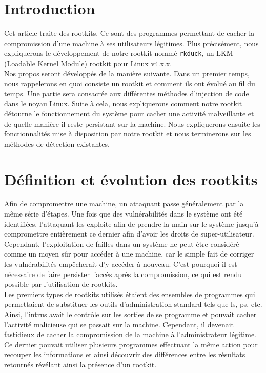 \documentclass[12pt]{article}
\begin{document}
\newcommand*{\escape}[1]{\texttt{\textbackslash#1}}
\newcommand*{\escapeI}[1]{\texttt{\expandafter\string\csname #1\endcsname}}
\newcommand*{\escapeII}[1]{\texttt{\char`\\#1}}


\section*{Introduction}

    Cet article traite des rootkits. Ce sont des programmes permettant de cacher la compromission d'une machine à ses utilisateurs légitimes. Plus précisément, nous expliquerons le développement de notre rootkit nommé \texttt{rkduck}, un LKM (Loadable Kernel Module) rootkit pour Linux v4.x.x. \\

    Nos propos seront développés de la manière suivante. Dans un premier temps, nous rappelerons en quoi consiste un rootkit et comment ils ont évolué au fil du temps. Une partie sera consacrée aux différentes méthodes d'injection de code dans le noyau Linux. Suite à cela, nous expliquerons comment notre rootkit détourne le fonctionnement du système pour cacher une activité malveillante et de quelle manière il reste persistant sur la machine. Nous expliquerons ensuite les fonctionnalités mise à disposition par notre rootkit et nous terminerons sur les méthodes de détection existantes.

\section{Définition et évolution des rootkits}

    Afin de compromettre une machine, un attaquant passe généralement par la même série d'étapes. Une fois que des vulnérabilités dans le système ont été identifiées, l'attaquant les exploite afin de prendre la main sur le système jusqu'à compromettre entièrement ce dernier afin d'avoir les droits de super-utilisateur.
    Cependant, l'exploitation de failles dans un système ne peut être considéré comme un moyen sûr pour accéder à une machine, car le simple fait de corriger les vulnérabilités empêcherait d'y accéder à nouveau. C'est pourquoi il est nécessaire de faire persister l'accès après la compromission, ce qui est rendu possible par l'utilisation de rootkits.\\
    
    Les premiers types de rootkits utilisés étaient des ensembles de programmes qui permettaient de substituer les outils d'administration standard tels que ls, ps, etc. Ainsi, l'intrus avait le contrôle sur les sorties de se programme et pouvait cacher l'activité malicieuse qui se passait sur la machine. Cependant, il devenait fastidieux de cacher la compromission de la machine à l'administrateur légitime. Ce dernier pouvait utiliser plusieurs programmes effectuant la même action pour recouper les informations et ainsi découvrir des différences entre les résultats retournés révélant ainsi la présence d'un rootkit.\\
    
\end{document}
